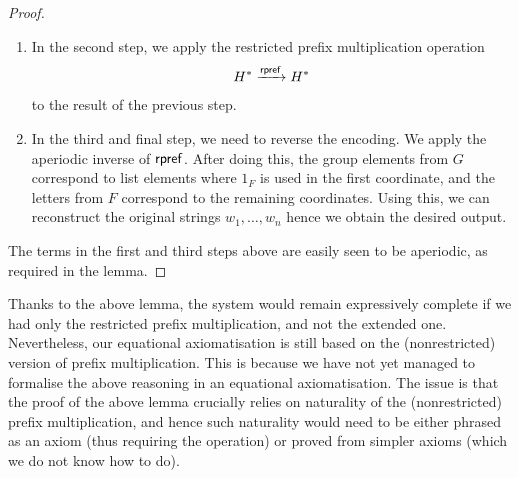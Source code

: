 \begin{proof}
\begin{enumerate}
        \item In the second step, we apply the restricted  prefix multiplication operation 
        \begin{align*}
        H^* \xrightarrow {\mathsf{rpref}} H^*
        \end{align*}
         to the result of the previous step. 
        \item In the third and final step, we need to reverse the encoding. We apply the aperiodic inverse of $\mathsf{rpref}$. After doing this, the  group elements from $G$ correspond to list elements where $1_F$ is used in the first coordinate, and the letters from $F$ correspond to the remaining coordinates. Using this, we can reconstruct the original strings $w_1,\ldots,w_n$ hence we obtain the desired output.
    \end{enumerate}
    The terms in the first and third steps above are easily seen to be aperiodic, as required in the lemma.        
    \end{proof}

    Thanks to the above lemma, the system would remain expressively complete if we had only the restricted prefix multiplication, and not the extended one. Nevertheless, our equational axiomatisation is still based on the (nonrestricted) version of prefix multiplication. This is because we have not yet managed to formalise the above reasoning in an equational axiomatisation. The issue is that the  proof of the above lemma crucially relies on naturality of the (nonrestricted) prefix multiplication, and hence such naturality would need to be either phrased as an axiom (thus requiring the operation) or proved from simpler axioms (which we do not know how to do).